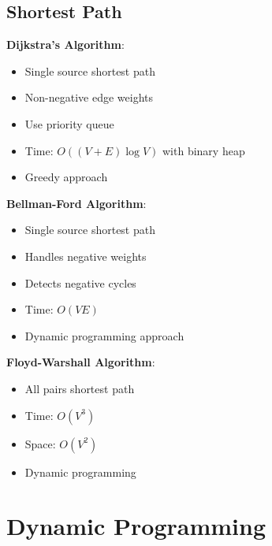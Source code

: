 \documentclass[12pt,a4paper]{report}
\begin{document}
\subsection{Shortest Path}
\begin{concept}
\textbf{Dijkstra's Algorithm}:
\begin{itemize}
    \item Single source shortest path
    \item Non-negative edge weights
    \item Use priority queue
    \item Time: $O((V + E) \log V)$ with binary heap
    \item Greedy approach
\end{itemize}

\textbf{Bellman-Ford Algorithm}:
\begin{itemize}
    \item Single source shortest path
    \item Handles negative weights
    \item Detects negative cycles
    \item Time: $O(VE)$
    \item Dynamic programming approach
\end{itemize}

\textbf{Floyd-Warshall Algorithm}:
\begin{itemize}
    \item All pairs shortest path
    \item Time: $O(V^3)$
    \item Space: $O(V^2)$
    \item Dynamic programming
\end{itemize}
\end{concept}

\section{Dynamic Programming}
\end{document}

